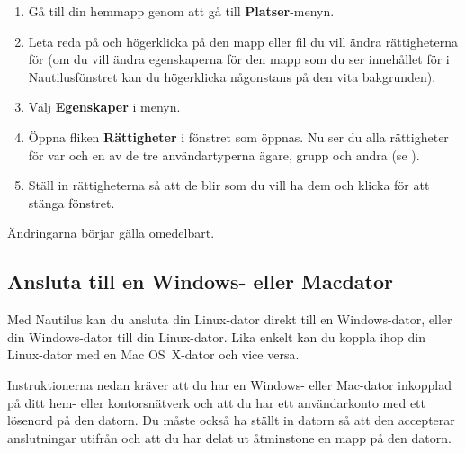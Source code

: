 \documentclass[a4paper,final]{memoir} %
\begin{document}
\begin{enumerate}

\item Gå till din hemmapp genom att gå till \textbf{Platser}-menyn.
\item Leta reda på och högerklicka på den mapp eller fil du vill ändra rättigheterna för (om du vill ändra egenskaperna för den mapp som du ser innehållet för i Nautilusfönstret kan du högerklicka någonstans på den vita bakgrunden).
\item Välj \textbf{Egenskaper} i menyn. 
\item Öppna fliken \textbf{Rättigheter} i fönstret som öppnas. Nu ser du alla rättigheter för var och en av de tre användartyperna ägare, grupp och andra (se ). 
\item Ställ in rättigheterna så att de blir som du vill ha dem och klicka \xstang{} för att stänga fönstret.

\end{enumerate}

Ändringarna börjar gälla omedelbart.



\subsection{Ansluta till en Windows- eller Macdator}\label{samba}



Med Nautilus kan du ansluta din Linux-dator direkt till en Windows-dator, eller din Windows-dator till din Linux-dator. Lika enkelt kan du koppla ihop din Linux-dator med en Mac OS~X-dator och vice versa.

Instruktionerna nedan kräver att du har en Windows- eller Mac-dator inkopplad på ditt hem- eller kontorsnätverk och att du har ett användarkonto med ett lösenord på den datorn. Du måste också ha ställt in datorn så att den accepterar anslutningar utifrån och att du har delat ut åtminstone en mapp på den datorn. 
\end{document}
